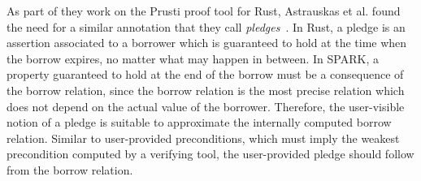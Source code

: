 \documentclass[runningheads]{llncs}
\begin{document}
As part of they work on the Prusti proof tool for Rust, Astrauskas et al. found the need for a similar annotation that they call \emph{pledges}~\cite{astrauskas2019leveraging}. In Rust, a pledge is an assertion associated to a borrower which is guaranteed to hold at the time when the borrow expires, no matter what may happen in between. In SPARK, a property guaranteed to hold at the end of the borrow must be a consequence of the borrow relation, since the borrow relation is the most precise relation which does not depend on the actual value of the borrower. Therefore, the user-visible notion of a pledge is suitable to approximate the internally computed borrow relation. Similar to user-provided preconditions, which must imply the weakest precondition computed by a verifying tool, the user-provided pledge should follow from the borrow relation.
\end{document}
